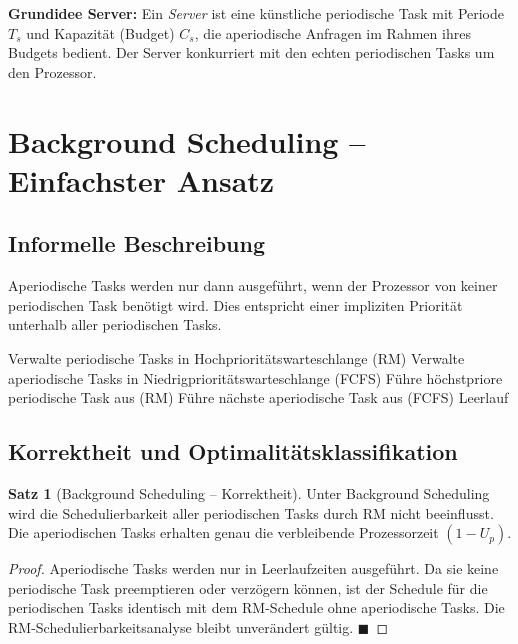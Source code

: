 ﻿\documentclass[a4paper,12pt]{report}
\theoremstyle{definition}
\newtheorem{satz}{Satz}[chapter]
\begin{document}
\textbf{Grundidee Server:} Ein \emph{Server} ist eine künstliche periodische
Task mit Periode $T_s$ und Kapazität (Budget) $C_s$, die aperiodische Anfragen
im Rahmen ihres Budgets bedient. Der Server konkurriert mit den echten periodischen
Tasks um den Prozessor.

\section{Background Scheduling -- Einfachster Ansatz}

\subsection{Informelle Beschreibung}

Aperiodische Tasks werden nur dann ausgeführt, wenn der Prozessor von keiner
periodischen Task benötigt wird. Dies entspricht einer impliziten Priorität
unterhalb aller periodischen Tasks.

\begin{algorithm}[H]
	\caption{Background Scheduling}
	\begin{algorithmic}[1]
		\State Verwalte periodische Tasks in Hochprioritätswarteschlange (RM)
		\State Verwalte aperiodische Tasks in Niedrigprioritätswarteschlange (FCFS)
		\Loop
		\State Führe höchstpriore periodische Task aus (RM)
		\State Führe nächste aperiodische Task aus (FCFS)
		\Else
		\State Leerlauf
		\EndIf
		\EndLoop
	\end{algorithmic}
\end{algorithm}

\subsection{Korrektheit und Optimalitätsklassifikation}

\begin{satz}[Background Scheduling -- Korrektheit]
	Unter Background Scheduling wird die Schedulierbarkeit aller periodischen
	Tasks durch RM nicht beeinflusst. Die aperiodischen Tasks erhalten genau
	die verbleibende Prozessorzeit $(1-U_p)$.
\end{satz}

\begin{proof}
	Aperiodische Tasks werden nur in Leerlaufzeiten ausgeführt. Da sie keine
	periodische Task preemptieren oder verzögern können, ist der Schedule für
	die periodischen Tasks identisch mit dem RM-Schedule ohne aperiodische Tasks.
	Die RM-Schedulierbarkeitsanalyse bleibt unverändert gültig. \hfill$\blacksquare$
\end{proof}
\end{document}
